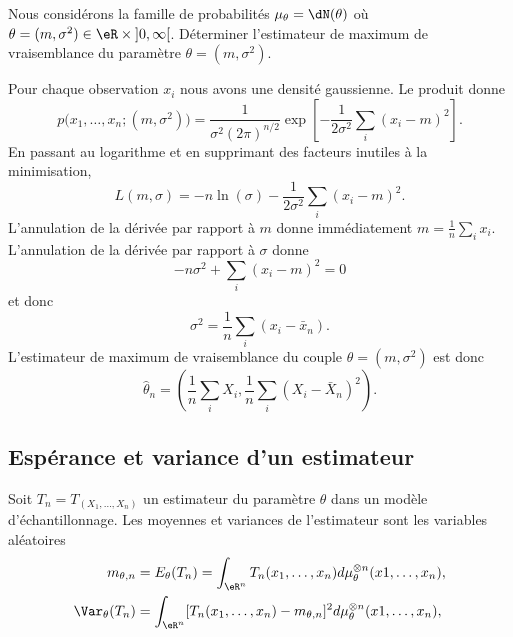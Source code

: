 \begin{example}
	Nous considérons la famille de probabilités \( \mu_{\theta}=\dN(\theta)\) où \( \theta=(m,\sigma^2)\in\eR\times\mathopen] 0 , \infty \mathclose[\). Déterminer l'estimateur de maximum de vraisemblance du paramètre \( \theta=(m,\sigma^2)\).

	Pour chaque observation \( x_i\) nous avons une densité gaussienne. Le produit donne
	\begin{equation}
		p\big( x_1,\ldots,x_n;(m,\sigma^2) \big)=\frac{1}{ \sigma^2(2\pi)^{n/2} }\exp\left[ -\frac{1}{ 2\sigma^2 }\sum_i(x_i-m)^2 \right].
	\end{equation}
	En passant au logarithme et en supprimant des facteurs inutiles à la minimisation,
	\begin{equation}
		L(m,\sigma)=-n\ln(\sigma)-\frac{1}{ 2\sigma^2 }\sum_i(x_i-m)^2.
	\end{equation}
	L'annulation de la dérivée par rapport à \( m\) donne immédiatement \( m=\frac{1}{ n }\sum_i x_i\). L'annulation de la dérivée par rapport à \( \sigma\) donne
	\begin{equation}
		-n\sigma^2+\sum_i(x_i-m)^2=0
	\end{equation}
	et donc
	\begin{equation}
		\sigma^2=\frac{1}{ n }\sum_i(x_i-\bar x_n).
	\end{equation}
	L'estimateur de maximum de vraisemblance du couple \( \theta=(m,\sigma^2)\) est donc
	\begin{equation}
		\hat\theta_n=\left( \frac{1}{ n }\sum_iX_i,\frac{1}{ n }\sum_i(X_i-\bar X_n)^2 \right).
	\end{equation}
\end{example}

\subsection{Espérance et variance d'un estimateur}

Soit \( T_n=T_(X_1,\ldots,X_n)\) un estimateur du paramètre \( \theta\) dans un modèle d'échantillonnage. Les moyennes et variances de l'estimateur sont les variables aléatoires
\begin{subequations}
	\begin{align}
		m_{\theta,n}       & =E_{\theta}(T_n)=\int_{\eR^n}T_n(x_1,\ldots,x_n)d\mu_{\theta}^{\otimes n}(x1,\ldots,x_n),  \\
		\Var_{\theta}(T_n) & =\int_{\eR^n}[T_n(x_1,\ldots,x_n)-m_{\theta,n}]^2d\mu_{\theta}^{\otimes n}(x1,\ldots,x_n),
	\end{align}
\end{subequations}

